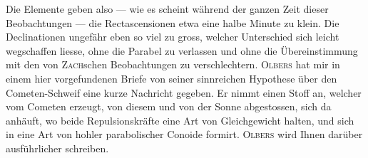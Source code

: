 \par\indent Die Elemente geben also --- wie es scheint während der ganzen Zeit dieser Beobachtungen --- die Rectascensionen etwa eine halbe Minute zu klein. Die Declinationen ungefähr eben so viel zu gross, welcher Unterschied sich leicht wegschaffen liesse, ohne die Parabel zu verlassen und ohne die Übereinstimmung mit den von \textsc{Zach}schen Beobachtungen zu verschlechtern. \textsc{Olbers} hat mir in einem hier vorgefundenen Briefe von seiner sinnreichen Hypothese über den Cometen-Schweif eine kurze Nachricht gegeben. Er nimmt einen Stoff an, welcher vom Cometen erzeugt, von diesem und von der Sonne abgestossen, sich da anhäuft, wo beide Repulsionskräfte eine Art von Gleichgewicht halten, und sich in eine Art von hohler parabolischer Conoide formirt. \textsc{Olbers} wird Ihnen darüber ausführlicher schreiben.
